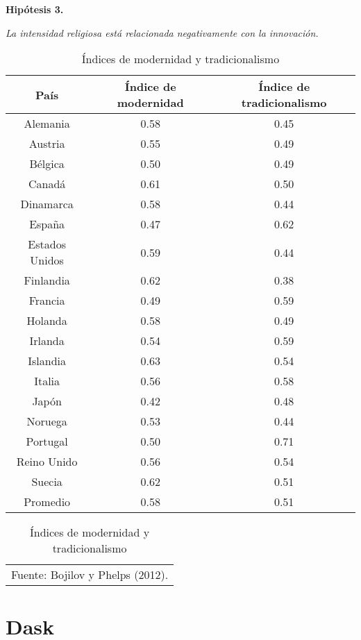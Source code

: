 \vspace{1em}
\noindent \textbf{Hipótesis 3.} \hfill\begin{minipage}{\dimexpr\textwidth-3cm}
\textit{La intensidad religiosa está relacionada negativamente con la innovación.}
\end{minipage}
\vspace{1em}


\begin{table}[H]
\centering
\caption{Índices de modernidad y tradicionalismo}
\label{PHEL}
\begin{tabular}{|ccc|}
\hline
 País & Índice de modernidad & Índice de tradicionalismo  \\ 
\hline
Alemania & 0.58 & 0.45 \\
Austria & 0.55 & 0.49  \\
Bélgica & 0.50 & 0.49  \\
Canadá & 0.61 & 0.50 \\
Dinamarca & 0.58 & 0.44 \\ 
España & 0.47 & 0.62 \\
Estados Unidos & 0.59 & 0.44  \\
Finlandia & 0.62 & 0.38 \\
Francia & 0.49 & 0.59 \\ 
Holanda & 0.58 & 0.49 \\ 
Irlanda & 0.54 & 0.59  \\
Islandia & 0.63 & 0.54 \\
Italia & 0.56 & 0.58  \\
Japón & 0.42 & 0.48 \\
Noruega & 0.53 & 0.44 \\
Portugal & 0.50 & 0.71 \\ 
Reino Unido & 0.56 & 0.54  \\
Suecia & 0.62 & 0.51 \\
Promedio & 0.58 & 0.51 \\
\hline
\end{tabular}

\begin{tabular}{c}
\footnotesize{Fuente: Bojilov y Phelps (2012).}
\end{tabular}

\end{table}


\section{Dask}


